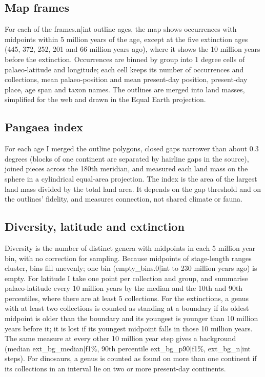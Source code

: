 \documentclass[11pt,a4paper]{article}
\begin{document}
\subsection{Map frames}
For each of the {{frames.n|int}} outline ages, the map shows occurrences with midpoints within 5 million years of the age, except at the five extinction ages (445, 372, 252, 201 and 66 million years ago), where it shows the 10 million years before the extinction. Occurrences are binned by group into 1 degree cells of palaeo-latitude and longitude; each cell keeps its number of occurrences and collections, mean palaeo-position and mean present-day position, present-day place, age span and taxon names. The outlines are merged into land masses, simplified for the web and drawn in the Equal Earth projection.

\subsection{Pangaea index}
For each age I merged the outline polygons, closed gaps narrower than about 0.3 degrees (blocks of one continent are separated by hairline gaps in the source), joined pieces across the 180th meridian, and measured each land mass on the sphere in a cylindrical equal-area projection. The index is the area of the largest land mass divided by the total land area. It depends on the gap threshold and on the outlines' fidelity, and measures connection, not shared climate or fauna.

\subsection{Diversity, latitude and extinction}
Diversity is the number of distinct genera with midpoints in each 5 million year bin, with no correction for sampling. Because midpoints of stage-length ranges cluster, bins fill unevenly; one bin ({{empty_bins.0|int}} to 230 million years ago) is empty. For latitude I take one point per collection and group, and summarise palaeo-latitude every 10 million years by the median and the 10th and 90th percentiles, where there are at least 5 collections. For the extinctions, a genus with at least two collections is counted as standing at a boundary if its oldest midpoint is older than the boundary and its youngest is younger than 10 million years before it; it is lost if its youngest midpoint falls in those 10 million years. The same measure at every other 10 million year step gives a background (median {{ext_bg_median|f1}}\%, 90th percentile {{ext_bg_p90|f1}}\%, {{ext_bg_n|int}} steps). For dinosaurs, a genus is counted as found on more than one continent if its collections in an interval lie on two or more present-day continents.
\end{document}
